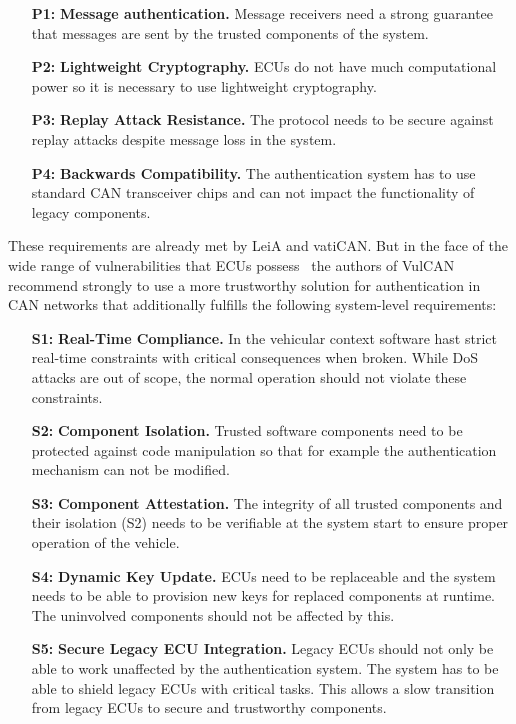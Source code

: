 \begin{enumerate}
    \item[\textbf{P1:}] \textbf{Message authentication. } Message receivers need
    a strong guarantee that messages are sent by the trusted components of the
    system.
    \item[\textbf{P2:}] \textbf{Lightweight Cryptography. } ECUs do not have
    much computational power so it is necessary to use lightweight cryptography.
    \item[\textbf{P3:}] \textbf{Replay Attack Resistance. } The protocol needs
    to be secure against replay attacks despite message loss in the system.
    \item[\textbf{P4:}] \textbf{Backwards Compatibility. } The authentication
    system has to use standard CAN transceiver chips and can not impact the
    functionality of legacy components.
\end{enumerate}

These requirements are already met by LeiA and vatiCAN\@. But in the face of the
wide range of vulnerabilities that ECUs possess~\cite{Checkoway2011,Koscher2010}
the authors of VulCAN recommend strongly to use a more trustworthy solution for
authentication in CAN networks that additionally fulfills the following
system-level requirements:


\begin{enumerate}
    \item[\textbf{S1:}] \textbf{Real-Time Compliance. } In the vehicular context
    software hast strict real-time constraints with critical consequences when
    broken. While DoS attacks are out of scope, the normal operation should not
    violate these constraints.
    \item[\textbf{S2:}] \textbf{Component Isolation. } Trusted software
    components need to be protected against code manipulation so that for
    example the authentication mechanism can not be modified.
    \item[\textbf{S3:}] \textbf{Component Attestation. } The integrity of all
    trusted components and their isolation (S2) needs to be verifiable at the
    system start to ensure proper operation of the vehicle.
    \item[\textbf{S4:}] \textbf{Dynamic Key Update. } ECUs need to be
    replaceable and the system needs to be able to provision new keys for
    replaced components at runtime. The uninvolved components should not be
    affected by this.
    \item[\textbf{S5:}] \textbf{Secure Legacy ECU Integration. } Legacy ECUs
    should not only be able to work unaffected by the authentication system. The
    system has to be able to shield legacy ECUs with critical tasks. This allows
    a slow transition from legacy ECUs to secure and trustworthy components.
\end{enumerate}

